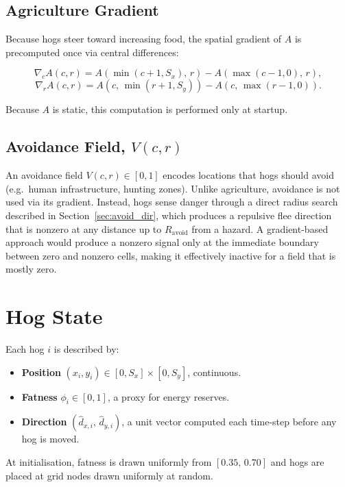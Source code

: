 \documentclass[11pt]{article}
\begin{document}
\subsection{Agriculture Gradient}

Because hogs steer toward increasing food, the spatial gradient of $A$ is
precomputed once via central differences:

\[
  \nabla_c A(c,r)
    = A(\min(c{+}1, S_x),\, r) - A(\max(c{-}1,0),\, r),
\]
\[
  \nabla_r A(c,r)
    = A(c,\, \min(r{+}1, S_y)) - A(c,\, \max(r{-}1,0)).
\]

Because $A$ is static, this computation is performed only at startup.

\subsection{Avoidance Field, $V(c,r)$}

An avoidance field $V(c,r) \in [0,1]$ encodes locations that hogs should avoid
(e.g.\ human infrastructure, hunting zones).  Unlike agriculture, avoidance is
not used via its gradient.  Instead, hogs sense danger through a direct
radius search described in Section~\ref{sec:avoid_dir}, which produces a
repulsive flee direction that is nonzero at any distance up to $R_{\mathrm{avoid}}$
from a hazard.  A gradient-based approach would produce a nonzero signal only
at the immediate boundary between zero and nonzero cells, making it effectively
inactive for a field that is mostly zero.

\section{Hog State}

Each hog $i$ is described by:

\begin{itemize}
  \item \textbf{Position} $(x_i, y_i) \in [0, S_x] \times [0, S_y]$, continuous.
  \item \textbf{Fatness} $\phi_i \in [0, 1]$, a proxy for energy reserves.
  \item \textbf{Direction} $(\hat{d}_{x,i},\, \hat{d}_{y,i})$, a unit vector
        computed each time-step before any hog is moved.
\end{itemize}

At initialisation, fatness is drawn uniformly from $[0.35,\, 0.70]$ and hogs
are placed at grid nodes drawn uniformly at random.
\end{document}
